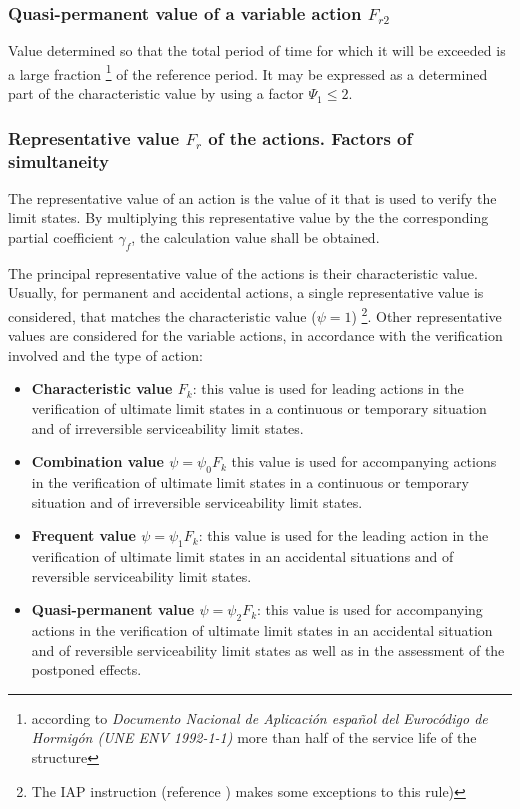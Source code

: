 \subsubsection{Quasi-permanent value of a variable action $F_{r2}$}
Value determined so that the total period of time for which it will be exceeded is a large fraction \footnote{according to \emph{Documento Nacional de Aplicaci\'{o}n espa\~{n}ol del Euroc\'{o}digo de Hormig\'{o}n (UNE ENV 1992-1-1)} more than half of the service life of the structure} of the reference period. It may be expressed as a determined part of the characteristic value by using a factor $\Psi_1 \le 2$.

\subsubsection{Representative value $F_r$ of the actions. Factors of simultaneity} \label{sc_coef_simult}
The representative value of an action is the value of it that is used to verify the limit states. By multiplying this representative value by the the corresponding partial coefficient $\gamma_f$, the calculation value shall be obtained.

The principal representative value of the actions is their characteristic value. Usually, for permanent and accidental actions, a single representative value is considered, that matches the characteristic value ($\psi= 1$) \footnote{The IAP instruction  (reference \cite{IAP}) makes some exceptions to this rule)}.
Other representative values are considered for the variable actions, in accordance with the verification involved and the type of action:

\begin{itemize}
\item \textbf{Characteristic value $F_k$}: this value is used for leading actions in the verification of ultimate limit states in a continuous or temporary situation and of irreversible serviceability limit states.
\item \textbf{Combination value $\psi= \psi_{0}F_k$} this value is used for accompanying actions in the verification of ultimate limit states in a continuous or temporary situation and of irreversible serviceability limit states.
\item \textbf{Frequent value $\psi= \psi_{1}F_k$}: this value is used for the leading action in the verification of ultimate limit states in an accidental situations and of reversible serviceability limit states.
\item \textbf{Quasi-permanent value $\psi= \psi_{2}F_k$}: this value is used for accompanying actions in the verification of ultimate limit states in an accidental situation and of reversible serviceability limit states as well as in the assessment of the postponed effects.
\end{itemize}

